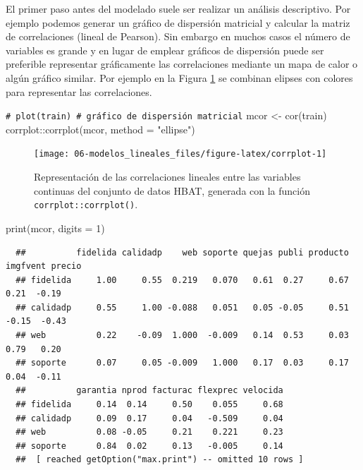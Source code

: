 \documentclass[
]{book}
\newenvironment{Shaded}{\begin{snugshade}}{\end{snugshade}}
\newcommand{\AttributeTok}[1]{\textcolor[rgb]{0.77,0.63,0.00}{#1}}
\newcommand{\CommentTok}[1]{\textcolor[rgb]{0.56,0.35,0.01}{\textit{#1}}}
\newcommand{\DecValTok}[1]{\textcolor[rgb]{0.00,0.00,0.81}{#1}}
\newcommand{\FunctionTok}[1]{\textcolor[rgb]{0.00,0.00,0.00}{#1}}
\newcommand{\NormalTok}[1]{#1}
\newcommand{\OtherTok}[1]{\textcolor[rgb]{0.56,0.35,0.01}{#1}}
\newcommand{\SpecialCharTok}[1]{\textcolor[rgb]{0.00,0.00,0.00}{#1}}
\newcommand{\StringTok}[1]{\textcolor[rgb]{0.31,0.60,0.02}{#1}}
\theoremstyle{break}
\theoremstyle{nonumberplain}
\renewcommand{\CommentTok}[1]{\textcolor[rgb]{0.41,0.41,0.41}{\texttt{#1}}}
\begin{document}
El primer paso antes del modelado suele ser realizar un análisis descriptivo.
Por ejemplo podemos generar un gráfico de dispersión matricial y calcular la matriz de correlaciones (lineal de Pearson).
Sin embargo en muchos casos el número de variables es grande y en lugar de emplear gráficos de dispersión puede ser preferible representar gráficamente las correlaciones mediante un mapa de calor o algún gráfico similar.
Por ejemplo en la Figura \ref{fig:corrplot} se combinan elipses con colores para representar las correlaciones.



\begin{Shaded}
\begin{Highlighting}[]
\CommentTok{\# plot(train) \# gráfico de dispersión matricial}
\NormalTok{mcor }\OtherTok{\textless{}{-}} \FunctionTok{cor}\NormalTok{(train)}
\NormalTok{corrplot}\SpecialCharTok{::}\FunctionTok{corrplot}\NormalTok{(mcor, }\AttributeTok{method =} \StringTok{"ellipse"}\NormalTok{)}
\end{Highlighting}
\end{Shaded}

\begin{figure}[!htb]

{\centering \texttt{[image: 06-modelos\_lineales\_files/figure-latex/corrplot-1]} 

}

\caption{Representación de las correlaciones lineales entre las variables continuas del conjunto de datos HBAT, generada con la función \texttt{corrplot::corrplot()}.}\label{fig:corrplot}
\end{figure}

\begin{Shaded}
\begin{Highlighting}[]
\FunctionTok{print}\NormalTok{(mcor, }\AttributeTok{digits =} \DecValTok{1}\NormalTok{)}
\end{Highlighting}
\end{Shaded}

\begin{verbatim}
  ##          fidelida calidadp    web soporte quejas publi producto imgfvent precio
  ## fidelida     1.00     0.55  0.219   0.070   0.61  0.27     0.67     0.21  -0.19
  ## calidadp     0.55     1.00 -0.088   0.051   0.05 -0.05     0.51    -0.15  -0.43
  ## web          0.22    -0.09  1.000  -0.009   0.14  0.53     0.03     0.79   0.20
  ## soporte      0.07     0.05 -0.009   1.000   0.17  0.03     0.17     0.04  -0.11
  ##          garantia nprod facturac flexprec velocida
  ## fidelida     0.14  0.14     0.50    0.055     0.68
  ## calidadp     0.09  0.17     0.04   -0.509     0.04
  ## web          0.08 -0.05     0.21    0.221     0.23
  ## soporte      0.84  0.02     0.13   -0.005     0.14
  ##  [ reached getOption("max.print") -- omitted 10 rows ]
\end{verbatim}
\end{document}
